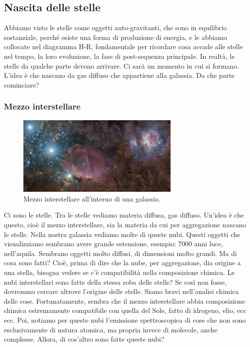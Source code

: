 \documentclass[a4paper,11pt]{article}
\begin{document}
\subsection{Nascita delle stelle}
Abbiamo visto le stelle come oggetti auto-gravitanti, che sono in equilibrio sostanziale, perché esiste una forma di produzione di energia, e le abbiamo collocate nel diagramma H-R, fondamentale per ricordare cosa accade alle stelle nel tempo, la loro evoluzione, la fase di post-sequenza principale. In realtà, le stelle da qualche parte devono arrivare. Ci sarà un momento in cui si formano. L'idea è che nascano da gas diffuso che appartiene alla galassia. Da che parte cominciare?
\subsubsection{Mezzo interstellare}
\begin{figure}[h!!]
        \centering
        \includegraphics[width=8cm]{lezione 28 novembre/mezzointerstellare.jpg}
        \caption{Mezzo interstellare all'interno di una galassia.}
        \label{lezione 28 novembre/mezzointerstellare.jpg}
    \end{figure}
Ci sono le stelle. Tra le stelle vediamo materia diffusa, gas diffuso. Un'idea è che questo, cioè il mezzo interstellare, sia la materia da cui per aggregazione nascano le stelle. Nella nostra galassia vediamo molte di queste nubi. Questi oggetti che visualizziamo sembrano avere grande estensione, esempio: 7000 anni luce, nell'aquila. Sembrano oggetti molto diffusi, di dimensioni molto grandi. Ma di cosa sono fatti? Cioè, prima di dire che la nube, per aggregazione, dia origine a una stella, bisogna vedere se c'è compatibilità nella composizione chimica. Le nubi interstellari sono fatte della stessa roba delle stelle? Se così non fosse, dovremmo cercare altrove l'origine delle stelle. Siamo bravi nell'analisi chimica delle cose. Fortunatamente, sembra che il mezzo interstellare abbia composizione chimica estremamente compatibile con quella del Sole, fatto di idrogeno, elio, ecc ecc. Poi, notiamo per queste nubi l'emissione spettroscopica di cose che non sono esclusivamente di natura atomica, ma propria invece di molecole, anche complesse. Allora, di cos'altro sono fatte queste nubi?\\ 
\end{document}
